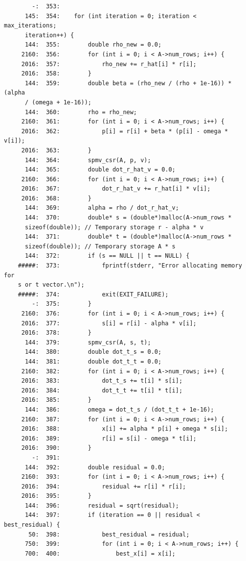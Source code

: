 \documentclass[12pt]{article}
\begin{document}
\begin{mdframed}[style=myboxstyleTerminal1]
\begin{verbatim}
        -:  353:
      145:  354:    for (int iteration = 0; iteration < max_iterations; 
      iteration++) {
      144:  355:        double rho_new = 0.0;
     2160:  356:        for (int i = 0; i < A->num_rows; i++) {
     2016:  357:            rho_new += r_hat[i] * r[i];
     2016:  358:        }
      144:  359:        double beta = (rho_new / (rho + 1e-16)) * (alpha 
      / (omega + 1e-16));
      144:  360:        rho = rho_new;
     2160:  361:        for (int i = 0; i < A->num_rows; i++) {
     2016:  362:            p[i] = r[i] + beta * (p[i] - omega * v[i]);
     2016:  363:        }
      144:  364:        spmv_csr(A, p, v);
      144:  365:        double dot_r_hat_v = 0.0;
     2160:  366:        for (int i = 0; i < A->num_rows; i++) {
     2016:  367:            dot_r_hat_v += r_hat[i] * v[i];
     2016:  368:        }
      144:  369:        alpha = rho / dot_r_hat_v;
      144:  370:        double* s = (double*)malloc(A->num_rows * 
      sizeof(double)); // Temporary storage r - alpha * v
      144:  371:        double* t = (double*)malloc(A->num_rows * 
      sizeof(double)); // Temporary storage A * s
      144:  372:        if (s == NULL || t == NULL) {
    #####:  373:            fprintf(stderr, "Error allocating memory for 
    s or t vector.\n");
    #####:  374:            exit(EXIT_FAILURE);
        -:  375:        }
     2160:  376:        for (int i = 0; i < A->num_rows; i++) {
     2016:  377:            s[i] = r[i] - alpha * v[i];
     2016:  378:        }
      144:  379:        spmv_csr(A, s, t);
      144:  380:        double dot_t_s = 0.0;
      144:  381:        double dot_t_t = 0.0;
     2160:  382:        for (int i = 0; i < A->num_rows; i++) {
     2016:  383:            dot_t_s += t[i] * s[i];
     2016:  384:            dot_t_t += t[i] * t[i];
     2016:  385:        }
      144:  386:        omega = dot_t_s / (dot_t_t + 1e-16);
     2160:  387:        for (int i = 0; i < A->num_rows; i++) {
     2016:  388:            x[i] += alpha * p[i] + omega * s[i];
     2016:  389:            r[i] = s[i] - omega * t[i];
     2016:  390:        }
        -:  391:
      144:  392:        double residual = 0.0;
     2160:  393:        for (int i = 0; i < A->num_rows; i++) {
     2016:  394:            residual += r[i] * r[i];
     2016:  395:        }
      144:  396:        residual = sqrt(residual);
      144:  397:        if (iteration == 0 || residual < best_residual) {
       50:  398:            best_residual = residual;
      750:  399:            for (int i = 0; i < A->num_rows; i++) {
      700:  400:                best_x[i] = x[i];

\end{verbatim}
\end{mdframed}
\end{document}
